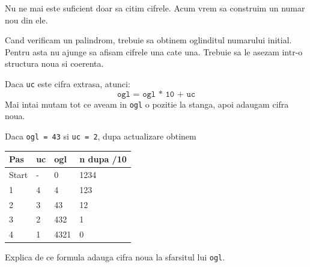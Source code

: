 
\begin{missionbox}
  Nu ne mai este suficient doar sa citim cifrele. Acum vrem sa construim un numar nou din ele.

  Cand verificam un palindrom, trebuie sa obtinem oglinditul numarului initial. Pentru asta nu ajunge sa afisam cifrele una cate una. Trebuie sa le asezam intr-o structura noua si coerenta.
\end{missionbox}

\begin{conceptbox}
  Daca \texttt{uc} este cifra extrasa, atunci:
  \[
    \texttt{ogl = ogl * 10 + uc}
  \]
  Mai intai mutam tot ce aveam in \texttt{ogl} o pozitie la stanga, apoi adaugam cifra noua.
\end{conceptbox}

\begin{guidebox}[Activare]
  Daca \texttt{ogl = 43} si \texttt{uc = 2}, dupa actualizare obtinem \hrulefill
\end{guidebox}

\newpage
{}

\begin{examplebox}[Exemplu pentru \texttt{n = 1234}]
  \begin{center}
  \begin{tabularx}{\linewidth}{|X|X|X|X|}
    \hline
    \textbf{Pas} & \textbf{uc} & \textbf{ogl} & \textbf{n dupa /10} \\
    \hline
    Start & - & 0 & 1234 \\
    \hline
    1 & 4 & 4 & 123 \\
    \hline
    2 & 3 & 43 & 12 \\
    \hline
    3 & 2 & 432 & 1 \\
    \hline
    4 & 1 & 4321 & 0 \\
    \hline
  \end{tabularx}
  \end{center}
\end{examplebox}

\begin{guidebox}
  Explica de ce formula adauga cifra noua la sfarsitul lui \texttt{ogl}.
\end{guidebox}

\newpage
{}

